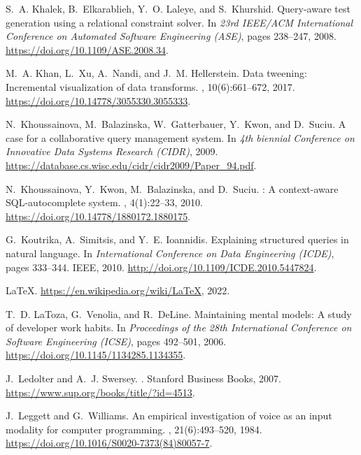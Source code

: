 \documentclass[letterpaper,11pt]{article}
\begin{document}
\begin{thebibliography}{100}
S.~A. Khalek, B.~Elkarablieh, Y.~O. Laleye, and S.~Khurshid.
\newblock Query-aware test generation using a relational constraint solver.
\newblock In {\em 23rd {IEEE/ACM} International Conference on Automated
  Software Engineering {(ASE})}, pages 238--247, 2008.
\newblock \url{https://doi.org/10.1109/ASE.2008.34}.

M.~A. Khan, L.~Xu, A.~Nandi, and J.~M. Hellerstein.
\newblock Data tweening: Incremental visualization of data transforms.
, 10(6):661--672, 2017.
\newblock \url{https://doi.org/10.14778/3055330.3055333}.

N.~Khoussainova, M.~Balazinska, W.~Gatterbauer, Y.~Kwon, and D.~Suciu.
\newblock A case for a collaborative query management system.
\newblock In {\em 4th biennial Conference on Innovative Data Systems Research
  ({CIDR})}, 2009.
\newblock \url{https://database.cs.wisc.edu/cidr/cidr2009/Paper\_94.pdf}.

N.~Khoussainova, Y.~Kwon, M.~Balazinska, and D.~Suciu.
: A context-aware {SQL}-autocomplete system.
, 4(1):22--33, 2010.
\newblock \url{https://doi.org/10.14778/1880172.1880175}.

G.~Koutrika, A.~Simitsis, and Y.~E. Ioannidis.
\newblock Explaining structured queries in natural language.
\newblock In {\em International Conference on Data Engineering ({ICDE})}, pages
  333--344. {IEEE}, 2010.
\newblock \url{http://doi.org/10.1109/ICDE.2010.5447824}.

LaTeX.
\newblock \url{https://en.wikipedia.org/wiki/LaTeX}, 2022.

T.~D. LaToza, G.~Venolia, and R.~DeLine.
\newblock Maintaining mental models: A study of developer work habits.
\newblock In {\em Proceedings of the 28th International Conference on Software
  Engineering (ICSE)}, pages 492--501, 2006.
\newblock \url{https://doi.org/10.1145/1134285.1134355}.

J.~Ledolter and A.~J. Swersey.
.
\newblock Stanford Business Books, 2007.
\newblock \url{https://www.sup.org/books/title/?id=4513}.

J.~Leggett and G.~Williams.
\newblock An empirical investigation of voice as an input modality for computer
  programming.
, 21(6):493--520,
  1984.
\newblock \url{https://doi.org/10.1016/S0020-7373(84)80057-7}.


\end{thebibliography}
\end{document}
